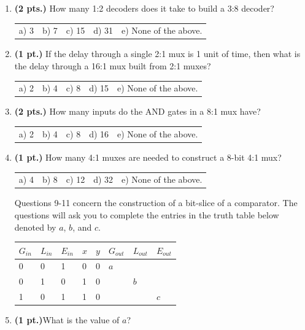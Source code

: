 \documentclass{article}
\begin{document}
\begin{enumerate}
\item {\bf (2 pts.)} How many 1:2 decoders does it take to build a 3:8 decoder?

\begin{tabular}{p{0.6in} p{0.6in} p{0.6in} p{0.6in} l}
a) 3 & b) 7 & c) 15 & d) 31 & e) None of the above.
\end{tabular}

\item {\bf (1 pt.)} If the delay through a single 2:1 mux is 1 unit of time,
then what is the delay through a 16:1 mux built from 2:1 muxes?

\begin{tabular}{p{0.6in} p{0.6in} p{0.6in} p{0.6in} l}
a) 2 & b) 4 & c) 8 & d) 15 & e) None of the above.
\end{tabular}

\item {\bf (2 pts.)} How many inputs do the AND gates in a 8:1 mux have?

\begin{tabular}{p{0.6in} p{0.6in} p{0.6in} p{0.6in} l}
a) 2 & b) 4 & c) 8 & d) 16 & e) None of the above.
\end{tabular}

\item {\bf (1 pt.)} How many 4:1 muxes are needed to construct a 8-bit 4:1 mux?

\begin{tabular}{p{0.6in} p{0.6in} p{0.6in} p{0.6in} l}
a) 4 & b) 8 & c) 12 & d) 32 & e) None of the above.
\end{tabular}

Questions 9-11 concern the construction of a bit-slice of a comparator.  
The questions will ask you to complete the entries in the truth table 
below denoted by $a$, $b$, and $c$.

\begin{tabular}{l|l|l|l|l||l|l|l}
$G_{in}$ & $L_{in}$ & $E_{in}$ & $x$ & $y$ & $G_{out}$ & $L_{out}$ & $E_{out}$ \\ \hline
    0    &    0     &     1    &  0  &  0  &   $a$     &           &  \\ \hline
    0    &    1     &     0    &  1  &  0  &           &   $b$     &  \\ \hline
    1    &    0     &     1    &  1  &  0  &           &           &  $c$    \\
\end{tabular}

\item {\bf (1 pt.)}What is the value of $a$?


\end{enumerate}
\end{document}
